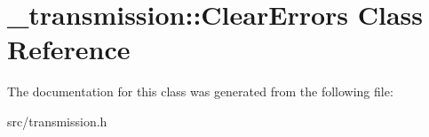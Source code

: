 \hypertarget{class__transmission_1_1ClearErrors}{}\section{\+\_\+transmission\+:\+:Clear\+Errors Class Reference}
\label{class__transmission_1_1ClearErrors}


The documentation for this class was generated from the following file\+:\begin{DoxyCompactItemize}
\item 
src/transmission.\+h\end{DoxyCompactItemize}
